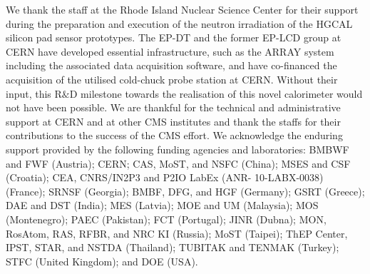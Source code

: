 \acknowledgments
We thank the staff at the Rhode Island Nuclear Science Center for their support during the preparation and execution of the neutron irradiation of the HGCAL silicon pad sensor prototypes.
The EP-DT and the former EP-LCD group at CERN have developed essential infrastructure, such as the ARRAY system including the associated data acquisition software, and have co-financed the acquisition of the utilised cold-chuck probe station at CERN.
Without their input, this R$\&$D milestone towards the realisation of this novel calorimeter would not have been possible. 
We are thankful for the technical and administrative support at CERN and at other CMS institutes and thank the staffs for their contributions to the success of the CMS effort. 
We acknowledge the enduring support provided by the following funding agencies and laboratories: BMBWF and FWF (Austria); CERN; CAS, MoST, and NSFC (China); MSES and CSF (Croatia); CEA, CNRS/IN2P3 and P2IO LabEx (ANR- 10-LABX-0038) (France); SRNSF (Georgia); BMBF, DFG, and HGF (Germany); GSRT (Greece); DAE and DST (India); MES (Latvia); MOE and UM (Malaysia); MOS (Montenegro); PAEC (Pakistan); FCT (Portugal); JINR (Dubna); MON, RosAtom, RAS, RFBR, and NRC KI (Russia); MoST (Taipei); ThEP Center, IPST, STAR, and NSTDA (Thailand); TUBITAK and TENMAK (Turkey); STFC (United Kingdom); and DOE (USA).
